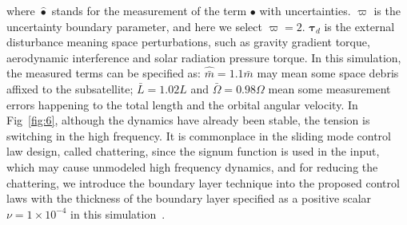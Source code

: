 \documentclass[3p]{elsarticle}
\theoremstyle{plain}
\theoremstyle{remark}
\begin{document}
where $\hat\bullet$ stands for the measurement of the term $\bullet$ with uncertainties. $\varpi$ is the uncertainty boundary parameter, and here we select $\varpi=2$. $\bm\tau_d$ is the external disturbance meaning  space perturbations, such as gravity gradient torque, aerodynamic interference and solar radiation pressure torque.  In this simulation, the measured terms can be specified as: $\hat{\bar m}=1.1\bar m$ may mean some space debris affixed to the subsatellite; $\bar L=1.02L$ and $\bar \Omega=0.98\Omega$ mean some measurement errors happening to the total length and the orbital angular velocity. In Fig~\ref{fig:6}, although the dynamics have already been  stable, the tension is switching in the high frequency. It is commonplace in the sliding mode control law design, called chattering, since the signum function is used in the input, which may cause unmodeled high frequency dynamics, and for reducing the chattering, we introduce the boundary layer technique into the proposed control laws with the thickness of the boundary layer specified as a positive scalar $\nu=1\times 10^{-4}$ in this simulation~\cite{1039802}.
\end{document}
